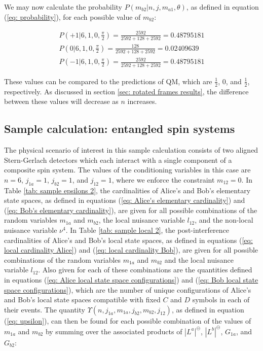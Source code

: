 \documentclass{article}
\begin{document}
We may now calculate the probability $P(m_{b2}|n,j,m_{a1},\theta)$, as defined in equation (\ref{eq: probability}), for each possible value of $m_{b2}$:

\begin{equation}
\begin{array}{ll}
    P(+1|6,1,0,\frac{\pi}{2})=\frac{2592}{2592+128+2592}=0.48795181\\
    P(0|6,1,0,\frac{\pi}{2})=\frac{128}{2592+128+2592}=0.02409639\\
    P(-1|6,1,0,\frac{\pi}{2})=\frac{2592}{2592+128+2592}=0.48795181
\end{array}
\end{equation}

These values can be compared to the predictions of QM, which are $\frac{1}{2}$, $0$, and $\frac{1}{2}$, respectively. As discussed in section \ref{sec: rotated frames results}, the difference between these values will decrease as $n$ increases. 

\subsection{Sample calculation: entangled spin systems \label{sec: sample entangled}}

The physical scenario of interest in this sample calculation consists of two aligned Stern-Gerlach detectors which each interact with a single component of a composite spin system. The values of the conditioning variables in this case are $n=6$, $j_{1a}=1$, $j_{b2}=1$, and $j_{12}=1$, where we enforce the constraint $m_{12}=0$. In Table \ref{tab: sample epsilons 2}, the cardinalities of Alice's and Bob's elementary state spaces, as defined in equations (\ref{eq: Alice's elementary cardinality}) and (\ref{eq: Bob's elementary cardinality}), are given for all possible combinations of the random variables $m_{1a}$ and $m_{b2}$, the local nuisance variable $l_{12}$, and the non-local nuisance variable $\nu^4$. In Table \ref{tab: sample local 2}, the post-interference cardinalities of Alice's and Bob's local state spaces, as defined in equations (\ref{eq: local cardinality Alice}) and (\ref{eq: local cardinality Bob}), are given for all possible combinations of the random variables $m_{1a}$ and $m_{b2}$ and the local nuisance variable $l_{12}$. Also given for each of these combinations are the quantities defined in equations (\ref{eq: Alice local state space configurations}) and (\ref{eq: Bob local state space configurations}), which are the number of unique configurations of Alice's and Bob's local state spaces compatible with fixed $C$ and $D$ symbols in each of their events. The quantity $\Upsilon(n,j_{1a},m_{1a},j_{b2},m_{b2},j_{12})$, as defined in equation (\ref{eq: upsilon}), can then be found for each possible combination of the values of $m_{1a}$ and $m_{b2}$ by summing over the associated products of $|L^a|^\circleddash$, $|L^b|^\circleddash$, $G_{1a}$, and $G_{b2}$:
\end{document}
